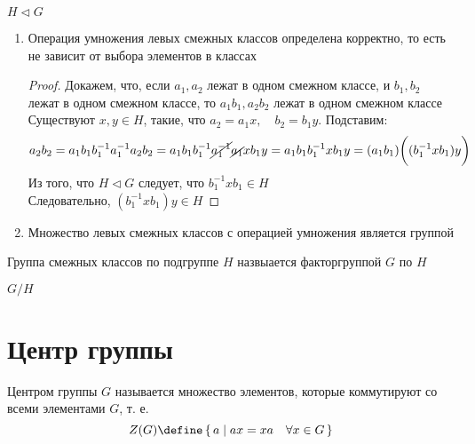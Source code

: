 \begin{theorem}[факторгруппа]
	$ H \vartriangleleft G $
	\begin{enumerate}
		\item Операция умножения левых смежных классов определена корректно, то есть не зависит от выбора элементов в классах
		\begin{proof}
			Докажем, что, если $ a_1, a_2 $ лежат в одном смежном классе, и $ b_1, b_2 $ лежат в одном смежном классе, то $ a_1b_1, a_2b_2 $ лежат в одном смежном классе \\
			Существуют $ x, y \in H $, такие, что $ a_2 = a_1x, \quad b_2 = b_1y $. Подставим:
			$$ a_2b_2 = a_1b_1b_1^{-1}a_1^{-1}a_2b_2 = a_1b_1b_1^{-1}\cancel{a_1^{-1}}\cancel{a_1}xb_1y = a_1b_1b_1^{-1}xb_1y = (a_1b_1) \bigg( (b_1^{-1}xb_1)y \bigg) $$
			Из того, что $ H \vartriangleleft G $ следует, что $ b_1^{-1}xb_1 \in H $ \\
			Следовательно, $ (b_1^{-1}xb_1)y \in H $
		\end{proof}
		\item Множество левых смежных классов с операцией умножения является группой
	\end{enumerate}
\end{theorem}

\begin{definition}
	Группа смежных классов по подгруппе $ H $ назвыается факторгруппой $ G $ по $ H $
\end{definition}

\begin{notation}
	$ G/H $
\end{notation}

\section{Центр группы}

\begin{definition}
	Центром группы $ G $ называется множество элементов, которые коммутируют со всеми элементами $ G $, т. е.
	$$ Z(G) \define \set{a | ax = xa \quad \forall x \in G} $$
\end{definition}


